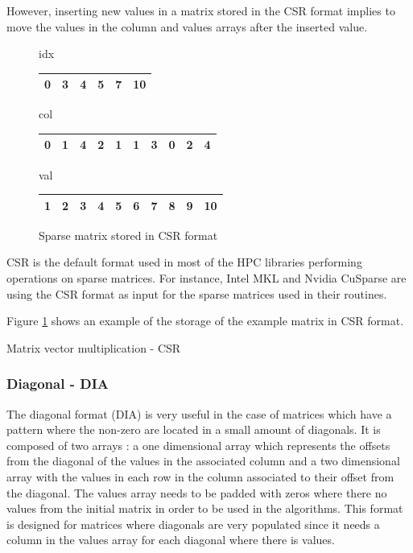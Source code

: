 However, inserting new values in a matrix stored in the CSR format implies to move the values in the column and values arrays after the inserted value.


\begin{figure}[h]
\centering
idx
\bigskip
\begin{tabular}{|cccccc|}
\hline
0 & 3 & 4 & 5 & 7 & 10 \\
\hline
\end{tabular}

col
\bigskip
\begin{tabular}{|cccccccccc|}
\hline
0 & 1 & 4 & 2 & 1 & 1 & 3 & 0 & 2 & 4 \\
\hline
\end{tabular}

val
\bigskip
\begin{tabular}{|cccccccccc|}
\hline
1 & 2 & 3 & 4 & 5 & 6 & 7 & 8 & 9 & 10 \\
\hline
\end{tabular}
\caption{Sparse matrix stored in CSR format \label{fig:methods:csr_ex}}
\end{figure}

CSR is the default format used in most of the HPC libraries performing operations on sparse matrices.
For instance, Intel MKL and Nvidia CuSparse are using the CSR format as input for the sparse matrices used in their routines.

Figure \ref{fig:methods:csr_ex} shows an example of the storage of the example matrix in CSR format.


\begin{algorithm}[h]
	\DontPrintSemicolon
	\caption{Matrix vector multiplication - CSR\label{fig:methods:csr_algo}}
\end{algorithm}


\subsubsection{Diagonal - DIA}
The diagonal format (DIA) is very useful in the case of matrices which have a pattern where the non-zero are located in a small amount of diagonals.
It is composed of two arrays : a one dimensional array which represents the offsets from the diagonal of the values in the associated column and a two dimensional array with the values in each row in the column associated to their offset from the diagonal.
The values array needs to be padded with zeros where there no values from the initial matrix in order to be used in the algorithms.
This format is designed for matrices where diagonals are very populated since it needs a column in the values array for each diagonal where there is values.

